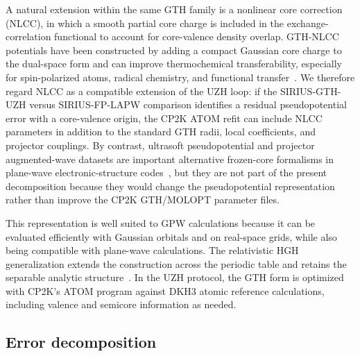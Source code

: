 \documentclass[aps,prb,reprint,amsmath,amssymb,superscriptaddress,longbibliography,floatfix]{revtex4-2}
\begin{document}
A natural extension within the same GTH family is a nonlinear core correction (NLCC), in which a smooth partial core charge is included in the exchange-correlation functional to account for core-valence density overlap. GTH-NLCC potentials have been constructed by adding a compact Gaussian core charge to the dual-space form and can improve thermochemical transferability, especially for spin-polarized atoms, radical chemistry, and functional transfer~\cite{Willand2013,Li2023GTHNLCC}. We therefore regard NLCC as a compatible extension of the UZH loop: if the SIRIUS-GTH-UZH versus SIRIUS-FP-LAPW comparison identifies a residual pseudopotential error with a core-valence origin, the CP2K ATOM refit can include NLCC parameters in addition to the standard GTH radii, local coefficients, and projector couplings. By contrast, ultrasoft pseudopotential and projector augmented-wave datasets are important alternative frozen-core formalisms in plane-wave electronic-structure codes~\cite{Vanderbilt1990,Blochl1994}, but they are not part of the present decomposition because they would change the pseudopotential representation rather than improve the CP2K GTH/MOLOPT parameter files.

This representation is well suited to GPW calculations because it can be evaluated efficiently with Gaussian orbitals and on real-space grids, while also being compatible with plane-wave calculations. The relativistic HGH generalization extends the construction across the periodic table and retains the separable analytic structure~\cite{Hartwigsen1998}. In the UZH protocol, the GTH form is optimized with CP2K's ATOM program against DKH3 atomic reference calculations, including valence and semicore information as needed.

\subsection{Error decomposition}
\end{document}
